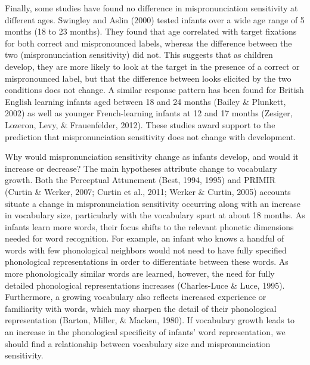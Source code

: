 \documentclass[man]{apa6}
\theoremstyle{definition}
\theoremstyle{definition}
\theoremstyle{definition}
\theoremstyle{remark}
\begin{document}
Finally, some studies have found no difference in mispronunciation
sensitivity at different ages. Swingley and Aslin (2000) tested infants
over a wide age range of 5 months (18 to 23 months). They found that age
correlated with target fixations for both correct and mispronounced
labels, whereas the difference between the two (mispronunciation
sensitivity) did not. This suggests that as children develop, they are
more likely to look at the target in the presence of a correct or
mispronounced label, but that the difference between looks elicited by
the two conditions does not change. A similar response pattern has been
found for British English learning infants aged between 18 and 24 months
(Bailey \& Plunkett, 2002) as well as younger French-learning infants at
12 and 17 months (Zesiger, Lozeron, Levy, \& Frauenfelder, 2012). These
studies award support to the prediction that mispronunciation
sensitivity does not change with development.

Why would mispronunciation sensitivity change as infants develop, and
would it increase or decrease? The main hypotheses attribute change to
vocabulary growth. Both the Perceptual Attunement (Best, 1994, 1995) and
PRIMIR (Curtin \& Werker, 2007; Curtin et al., 2011; Werker \& Curtin,
2005) accounts situate a change in mispronunciation sensitivity
occurring along with an increase in vocabulary size, particularly with
the vocabulary spurt at about 18 months. As infants learn more words,
their focus shifts to the relevant phonetic dimensions needed for word
recognition. For example, an infant who knows a handful of words with
few phonological neighbors would not need to have fully specified
phonological representations in order to differentiate between these
words. As more phonologically similar words are learned, however, the
need for fully detailed phonological representations increases
(Charles-Luce \& Luce, 1995). Furthermore, a growing vocabulary also
reflects increased experience or familiarity with words, which may
sharpen the detail of their phonological representation (Barton, Miller,
\& Macken, 1980). If vocabulary growth leads to an increase in the
phonological specificity of infants' word representation, we should find
a relationship between vocabulary size and mispronunciation sensitivity.
\end{document}
